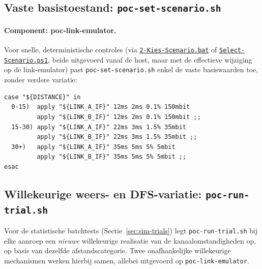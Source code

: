 \subsection{Vaste basistoestand: \texttt{poc-set-scenario.sh}}%
\label{subsec:vaste-toestand}

\paragraph{Component: poc-link-emulator.} Voor snelle, deterministische controles (via
\href{code/scripts/2-Kies-Scenario.bat}{\texttt{2-Kies-Scenario.bat}} of
\href{code/scripts/Select-Scenario.ps1}{\texttt{Select-Scenario.ps1}}, beide uitgevoerd
vanaf de host, maar met de effectieve wijziging op de link-emulator) past
\texttt{poc-set-scenario.sh} enkel de vaste basiswaarden toe, zonder verdere variatie:


\begin{listing}[h]
\begin{lstlisting}[style=bashstyle]
case "${DISTANCE}" in
  0-15)  apply "${LINK_A_IF}" 12ms 2ms 0.1% 150mbit
         apply "${LINK_B_IF}" 12ms 2ms 0.1% 150mbit ;;
  15-30) apply "${LINK_A_IF}" 22ms 3ms 1.5% 35mbit
         apply "${LINK_B_IF}" 22ms 3ms 1.5% 35mbit ;;
  30+)   apply "${LINK_A_IF}" 35ms 5ms 5% 5mbit
         apply "${LINK_B_IF}" 35ms 5ms 5% 5mbit ;;
esac
\end{lstlisting}
\caption[poc-set-scenario.sh]{Kern van \texttt{poc-set-scenario.sh}: één vaste
\texttt{netem}-instelling per afstandscategorie, bedoeld voor snelle, herhaalbare
controles. Aangeroepen vanaf de host, uitgevoerd op: \texttt{poc-link-emulator}.}
\label{lst:poc-set-scenario}
\end{listing}

\subsection{Willekeurige weers- en DFS-variatie: \texttt{poc-run-trial.sh}}%
\label{subsec:willekeurige-trial}

Voor de statistische batchtests (Sectie~\ref{sec:sim-trials}) legt
\texttt{poc-run-trial.sh} bij elke aanroep een \emph{nieuwe} willekeurige realisatie van
de kanaalomstandigheden op, op basis van dezelfde afstandscategorie. Twee onafhankelijke
willekeurige mechanismen werken hierbij samen, allebei uitgevoerd op
\texttt{poc-link-emulator}.

